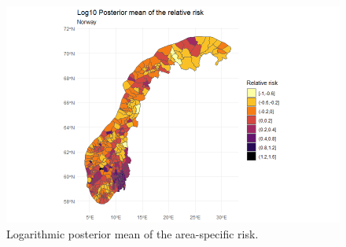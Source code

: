 %     
\begin{figure}[H]
    \centering
    \includegraphics[width = \textwidth]{posterior_norway_infra_log.png}
    \caption{Logarithmic posterior mean of the area-specific risk.}
    \label{posteriorNorwayInfraLog}
\end{figure}
%     
